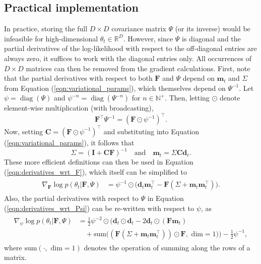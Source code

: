 \documentclass[msc,deptreport.inf]{infthesis} %
\newcommand{\matr}[1]{\mathbf{#1}}
\newcommand{\R}{\mathbb R}
\newcommand{\N}{\mathbb N}
\newcommand{\diag}{\mathop{\mathrm{diag}}}
\begin{document}
\subsection{Practical implementation}

In practice, storing the full $D\times D$ covariance matrix $\Psi$ (or its inverse) would be infeasible for high-dimensional $\theta_t \in \R^D$. However, since $\Psi$ is diagonal and the partial derivatives of the log-likelihood with respect to the off-diagonal entries are always zero, it suffices to work with the diagonal entries only. All occurrences of $D \times D$ matrices can then be removed from the gradient calculations. First, note that the partial derivatives with respect to both $\matr{F}$ and $\Psi$ depend on $\matr{m}_t$ and $\Sigma$ from Equation (\ref{eqn:variational_params}), which themselves depend on  $\Psi^{-1}$. Let $\psi = \diag(\Psi)$ and $\psi^{-n} = \diag(\Psi^{-n})$ for $n \in \N^+$. Then, letting $\odot$ denote element-wise multiplication (with broadcasting),
\begin{equation}
	\matr{F}^\intercal \Psi^{-1} = (\matr{F} \odot \psi^{-1})^\intercal.
\end{equation}
Now, setting $\matr{C} =  (\matr{F} \odot \psi^{-1})^\intercal$ and substituting into Equation (\ref{eqn:variational_params}), it follows that 
\begin{equation}\label{eqn:efficient_m_and_sigma}
	\Sigma = (\matr{I} + \matr{C} \matr{F})^{-1} \quad \text{and} \quad \matr{m}_t = \Sigma \matr{C} \matr{d}_t.
\end{equation}
These more efficient definitions can then be used in Equation (\ref{eqn:derivatives_wrt_F}), which itself can be simplified to 
\begin{align}\label{eqn:efficient_derivatives_wrt_F}
\begin{split}
	\nabla_{\matr{F}} \log p(\theta_t | \matr{F}, \Psi) 
	& = \psi^{-1} \odot \big(\matr{d}_t \matr{m}_t^\intercal  - \matr{F}  (\Sigma + \matr{m}_t \matr{m}_t^\intercal) \big).
\end{split}
\end{align} 
Also, the partial derivatives with respect to $\Psi$ in Equation (\ref{eqn:derivatives_wrt_Psi}) can be re-written with respect to $\psi$, as 
\begin{align}
\begin{split}\label{eqn:efficient_derivatives_wrt_Psi}
	\nabla_{\psi} \log p(\theta_t | \matr{F}, \Psi) 
	& = \frac{1}{2} \psi^{-2} \odot \Big(\matr{d}_t \odot \matr{d}_t - 2\matr{d}_t \odot (\matr{F} \matr{m}_t) \\
	& \quad + \text{sum}\big((\matr{F} (\Sigma + \matr{m}_t \matr{m}_t^\intercal)) \odot \matr{F}, \text{ dim} = 1\big) \Big)
	 - \frac{1}{2} \psi^{-1},
\end{split}
\end{align} 
where $\text{sum}(\cdot, \text{ dim} = 1)$ denotes the operation of summing along the rows of a matrix. 
\end{document}

